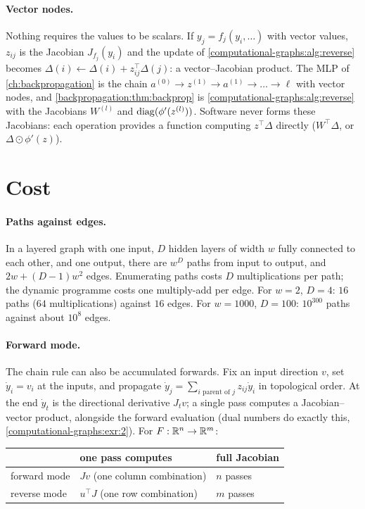 \begin{notechapter}
\paragraph{Vector nodes.} Nothing requires the values to be scalars. If $y_j = f_j(y_i,\dots)$ with vector
values, $z_{ij}$ is the Jacobian $J_{f_j}(y_i)$ and the update of \cref{computational-graphs:alg:reverse}
becomes $\Delta(i)\gets\Delta(i) + z_{ij}^\top\Delta(j)$: a vector--Jacobian product. The MLP of \cref{ch:backpropagation} is
the chain $a^{(0)}\to z^{(1)}\to a^{(1)}\to\dots\to\ell$ with vector nodes, and \cref{backpropagation:thm:backprop} is
\cref{computational-graphs:alg:reverse} with the Jacobians $W^{(l)}$ and $\operatorname{diag}(\phi'(z^{(l)}))$. Software never forms these
Jacobians: each operation provides a function computing $z^\top\Delta$ directly ($W^\top\Delta$, or $\Delta\odot\phi'(z)$).

\section{Cost}\label{computational-graphs:sec:cost}

\paragraph{Paths against edges.} In a layered graph with one input, $D$ hidden layers of
width $w$ fully connected to each other, and one output, there are $w^D$ paths from input to
output, and $2w + (D - 1)w^2$ edges. Enumerating paths costs $D$ multiplications per path; the
dynamic programme costs one multiply-add per edge. For $w = 2$, $D = 4$: $16$ paths ($64$
multiplications) against $16$ edges. For $w = 1000$, $D = 100$: $10^{300}$ paths against about $10^8$
edges.

\paragraph{Forward mode.} The chain rule can also be accumulated forwards. Fix an input
direction $v$, set $\dot y_i = v_i$ at the inputs, and propagate $\dot y_j = \sum_{i\text{ parent of }j}z_{ij}\dot y_i$ in topological
order. At the end $\dot y_t$ is the directional derivative $J_t v$; a single pass computes a
Jacobian--vector product, alongside the forward evaluation (dual numbers do exactly this,
\cref{computational-graphs:exr:2}). For $F:\mathbb{R}^n\to\mathbb{R}^m$:

\begin{center}
\begin{tabular}{lll}
\toprule
& one pass computes & full Jacobian \\
\midrule
forward mode & $J v$ (one column combination) & $n$ passes \\
reverse mode & $u^\top J$ (one row combination) & $m$ passes \\
\bottomrule
\end{tabular}
\end{center}


\end{notechapter}
